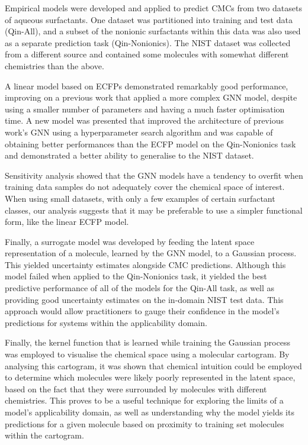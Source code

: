 Empirical models were developed and applied to predict CMCs from two datasets of
aqueous surfactants. One dataset was partitioned into training and test data
(Qin-All), and a subset of the nonionic surfactants within this data was also
used as a separate prediction task (Qin-Nonionics). The NIST dataset was
collected from a different source and contained some molecules with somewhat
different chemistries than the above.

A linear model based on ECFPs demonstrated remarkably good performance,
improving on a previous work \cite{qinPredictingCriticalMicelle2021} that
applied a more complex GNN model, despite using a smaller number of parameters
and having a much faster optimisation time. A new model was presented that
improved the architecture of previous work's GNN using a hyperparameter search
algorithm and was capable of obtaining better performances than the ECFP model
on the Qin-Nonionics task and demonstrated a better ability to generalise to the
NIST dataset.

Sensitivity analysis showed that the GNN models have a tendency to overfit when
training data samples do not adequately cover the chemical space of interest.
When using small datasets, with only a few examples of certain surfactant
classes, our analysis suggests that it may be preferable to use a simpler
functional form, like the linear ECFP model.

Finally, a surrogate model was developed by feeding the latent space
representation of a molecule, learned by the GNN model, to a Gaussian process.
This yielded uncertainty estimates alongside CMC predictions. Although this
model failed when applied to the Qin-Nonionics task, it yielded the best
predictive performance of all of the models for the Qin-All task, as well as
providing good uncertainty estimates on the in-domain NIST test data. This
approach would allow practitioners to gauge their confidence in the model's
predictions for systems within the applicability domain.

Finally, the kernel function that is learned while training the Gaussian process
was employed to visualise the chemical space using a molecular cartogram. By
analysing this cartogram, it was shown that chemical intuition could be employed
to determine which molecules were likely poorly represented in the latent space,
based on the fact that they were surrounded by molecules with different
chemistries. This proves to be a useful technique for exploring the limits of a
model's applicability domain, as well as understanding why the model yields its
predictions for a given molecule based on proximity to training set molecules
within the cartogram.